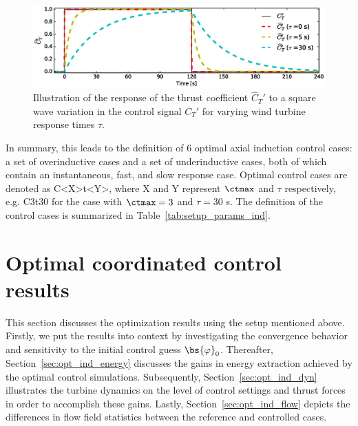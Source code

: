 \begin{figure}[t]
	\centering
	\includegraphics[width=\textwidth]{chapters/optimal_control_problem/figure3_bw.eps}    
	\caption{Illustration of the response of the thrust coefficient $\widehat{C}_T'$ to a square wave variation in the control signal $C_T'$ for varying wind turbine response times $\tau$. \label{fig:cthat_ind}}
\end{figure}
 
In summary, this leads to the definition of 6 optimal axial induction control cases: a set of overinductive cases and a set of underinductive cases, both of which contain an instantaneous, fast, and slow response case. Optimal control cases are denoted as C<X>t<Y>, where X and Y represent $\ctmax$ and $\tau$ respectively, e.g. C3t30 for the case with $\ctmax=3$ and $\tau=30$ s. The definition of the control cases is summarized in Table~\ref{tab:setup_params_ind}.



\section{Optimal coordinated control results}\label{sec:opt_ind_results}
This section discusses the optimization results using the setup mentioned above. Firstly, we put the results into context by investigating the convergence behavior and sensitivity to the initial control guess $\bs{\varphi}_0$. Thereafter, Section~\ref{sec:opt_ind_energy} discusses the gains in energy extraction achieved by the optimal control simulations. Subsequently, Section~\ref{sec:opt_ind_dyn} illustrates the turbine dynamics on the level of control settings and thrust forces in order to accomplish these gains. Lastly, Section~\ref{sec:opt_ind_flow} depicts the differences in flow field statistics between the reference and controlled cases.

